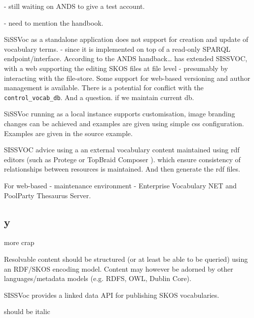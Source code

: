 \documentclass[10pt,a4paper]{article}
\newenvironment{italicquotes}
{\begin{quote}\itshape}
{\end{quote}}
\begin{document}
\begin{flushleft}
\begin{italicquotes}
  \end{italicquotes} 

  - still waiting on ANDS to give a test account.

  - need to mention the handbook.

  SiSSVoc as a standalone application does not support for creation and update
  of vocabulary terms.  - since it is implemented on top of a read-only SPARQL
  endpoint/interface.  According to the ANDS handback… has extended SISSVOC, with
  a web supporting the editing SKOS files at file level - presumably by
  interacting with the file-store. Some support for web-based versioning and
  author management is available. There is a potential for conflict with the
  \texttt{control\_vocab\_db}. And a question. if we maintain current db.

  SiSSVoc running as a local instance supports customisation, image branding
changes can be achieved and examples are given using simple css configuration.
Examples are given in the source example.

  SISSVOC advice using a an external vocabulary content maintained using rdf
editors (such as Protege or TopBraid Composer ). which ensure consistency of
relationships between resources is maintained. And then generate the rdf files. 

  For web-based - maintenance environment - Enterprise Vocabulary NET and
PoolParty Thesaurus Server. 




\subsection{y}
  more crap


\begin{subsection}{Resolvable content should be structured (or at least be able to be queried)
  using an RDF/SKOS encoding model. Content may however be adorned by other
  languages/metadata models (e.g. RDFS, OWL, Dublin Core).  }

	SISSVoc provides a linked data API for publishing SKOS vocabularies.


  \begin{textit}{
    should be italic
  }
  \end{textit}


\end{subsection}





  \end{flushleft}
\end{document}
